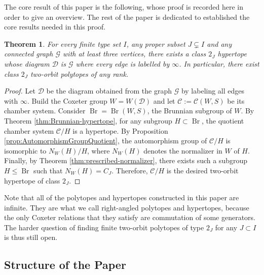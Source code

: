 \documentclass[10pt,a4paper]{amsart}
\newtheorem{thmalpha}{Theorem}
\newcommand{\C}{\mathcal{C}}
\newcommand{\Br}{\operatorname{Br}}
\begin{document}
The core result of this paper is the following, whose proof is recorded here in order to give an overview. The rest of the paper is dedicated to established the core results needed in this proof. 

\begin{thmalpha}\label{thm:main}
    For every finite type set $I$, any proper subset $J \subsetneq I$ and any connected graph $\mathcal{G}$ with at least three vertices, there exists a class $2_J$ hypertope whose diagram $\mathcal{D}$ is $\mathcal{G}$ where every edge is labelled by $\infty$. In particular, there exist class $2_J$ two-orbit polytopes of any rank.
\end{thmalpha}

\begin{proof}
    Let $\mathcal{D}$ be the diagram obtained from the graph $\mathcal{G}$ by labeling all edges with $\infty$. Build the Coxeter group $W = W(\mathcal{D})$ and let $\C := \mathcal{C}(W,S)$ be its chamber system. Consider $\Br = \Br(W,S)$, the Brunnian subgroup of $W$. By Theorem \ref{thm:Brunnian-hypertope}, for any subgroup $H \subset \Br$, the quotient chamber system $\C/H$ is a hypertope. By Proposition \ref{prop:AutomorphismGroupQuotient}, the automorphism group of $\C/H$ is isomorphic to $N_W(H)/H$, where $N_W(H)$ denotes the normalizer in $W$ of $H$. Finally, by Theorem \ref{thm:prescribed-normalizer}, there exists such a subgroup $H \leq \Br$ such that $N_W(H) = C_J$. Therefore, $\mathcal{C}/H$ is the desired two-orbit hypertope of class $2_J$.
\end{proof}


Note that all of the polytopes and hypertopes constructed in this paper are infinite. They are what we call right-angled polytopes and hypertopes, because the only Coxeter relations that they satisfy are commutation of some generators. The harder question of finding finite two-orbit polytopes of type $2_J$ for any $J \subset I$ is thus still open.

\subsection{Structure of the Paper}
\end{document}
